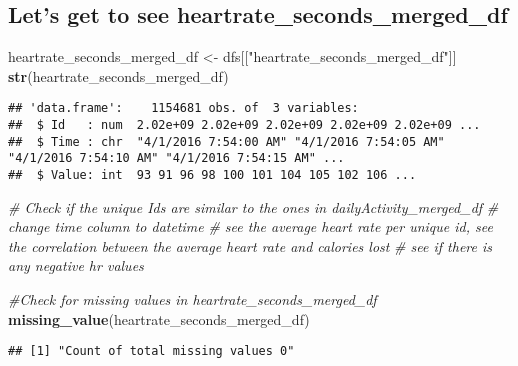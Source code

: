 \documentclass[
]{article}
\newenvironment{Shaded}{\begin{snugshade}}{\end{snugshade}}
\newcommand{\CommentTok}[1]{\textcolor[rgb]{0.56,0.35,0.01}{\textit{#1}}}
\newcommand{\FunctionTok}[1]{\textcolor[rgb]{0.13,0.29,0.53}{\textbf{#1}}}
\newcommand{\NormalTok}[1]{#1}
\newcommand{\OtherTok}[1]{\textcolor[rgb]{0.56,0.35,0.01}{#1}}
\newcommand{\StringTok}[1]{\textcolor[rgb]{0.31,0.60,0.02}{#1}}
\begin{document}
\subsection{Let's get to see
heartrate\_seconds\_merged\_df}\label{lets-get-to-see-heartrate_seconds_merged_df}

\begin{Shaded}
\begin{Highlighting}[]
\NormalTok{heartrate\_seconds\_merged\_df }\OtherTok{\textless{}{-}}\NormalTok{ dfs[[}\StringTok{"heartrate\_seconds\_merged\_df"}\NormalTok{]]}
\FunctionTok{str}\NormalTok{(heartrate\_seconds\_merged\_df)}
\end{Highlighting}
\end{Shaded}

\begin{verbatim}
## 'data.frame':    1154681 obs. of  3 variables:
##  $ Id   : num  2.02e+09 2.02e+09 2.02e+09 2.02e+09 2.02e+09 ...
##  $ Time : chr  "4/1/2016 7:54:00 AM" "4/1/2016 7:54:05 AM" "4/1/2016 7:54:10 AM" "4/1/2016 7:54:15 AM" ...
##  $ Value: int  93 91 96 98 100 101 104 105 102 106 ...
\end{verbatim}

\begin{Shaded}
\begin{Highlighting}[]
\CommentTok{\# Check if the unique Ids are similar to the ones in dailyActivity\_merged\_df}
\CommentTok{\# change time column to datetime}
\CommentTok{\# see the average heart rate per unique id, see the correlation between the average heart rate and calories lost}
\CommentTok{\# see if there is any negative hr values}
\end{Highlighting}
\end{Shaded}

\begin{Shaded}
\begin{Highlighting}[]
\CommentTok{\#Check for missing values in heartrate\_seconds\_merged\_df}
\FunctionTok{missing\_value}\NormalTok{(heartrate\_seconds\_merged\_df)}
\end{Highlighting}
\end{Shaded}

\begin{verbatim}
## [1] "Count of total missing values 0"
\end{verbatim}
\end{document}
